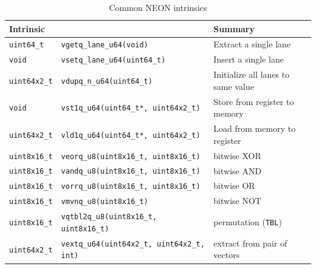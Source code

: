 \begin{table}[h!]
    \centering
    \footnotesize
    \caption{Common NEON intrinsics}
    \begin{tabularx}{\textwidth}{llX}
        \toprule
        Intrinsic && Summary \\
        \midrule
        \texttt{uint64\_t} & \texttt{vgetq\_lane\_u64(void)} & Extract a single lane \\
        \midrule
        \texttt{void} & \texttt{vsetq\_lane\_u64(uint64\_t)} & Insert a single lane \\
        \midrule
        \texttt{uint64x2\_t} & \texttt{vdupq\_n\_u64(uint64\_t)} & Initialize all lanes to same value \\
        \midrule
        \texttt{void} & \texttt{vst1q\_u64(uint64\_t*, uint64x2\_t)} & Store from register to memory \\
        \midrule
        \texttt{uint64x2\_t} & \texttt{vld1q\_u64(uint64\_t*, uint64x2\_t)} & Load from memory to register \\
        \midrule
        \texttt{uint8x16\_t} & \texttt{veorq\_u8(uint8x16\_t, uint8x16\_t)} & bitwise XOR \\
        \midrule
        \texttt{uint8x16\_t} & \texttt{vandq\_u8(uint8x16\_t, uint8x16\_t)} & bitwise AND \\
        \midrule
        \texttt{uint8x16\_t} & \texttt{vorrq\_u8(uint8x16\_t, uint8x16\_t)} & bitwise OR \\
        \midrule
        \texttt{uint8x16\_t} & \texttt{vmvnq\_u8(uint8x16\_t)} & bitwise NOT \\
        \midrule
        \texttt{uint8x16\_t} & \texttt{vqtbl2q\_u8(uint8x16\_t, uint8x16\_t)} & permutation (\texttt{TBL}) \\
        \midrule
        \texttt{uint64x2\_t} & \texttt{vextq\_u64(uint64x2\_t, uint64x2\_t, int)} & extract from pair of vectors \\
        \bottomrule
    \end{tabularx}
\end{table}
